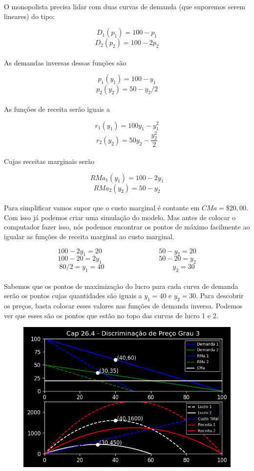 \documentclass[a4paper,11pt,oneside]{book}
\theoremstyle{definition}
\theoremstyle{break}
\begin{document}
O monopolista precisa lidar com duas curvas de demanda (que suporemos serem lineares) do tipo:

$$ D_1(p_1) = 100 - p_1 $$
$$ D_2(p_2) = 100 - 2p_2 $$
\\
As demandas inversas dessas funções são

$$ p_1(y_1) = 100 - y_1 $$
$$ p_2(y_2) = 50 - y_2/2 $$
\\
As funções de receita serão iguais a

$$ r_1(y_1) = 100y_1 - y_{1}^{2} $$
$$ r_2(y_2) = 50y_2 - \frac{y_{2}^{2}}{2} $$
\\
Cujas receitas marginais serão

$$ RMa_1(y_1) = 100 - 2y_{1} $$
$$ RMa_2(y_2) = 50 - y_{2} $$
\\
Para simplificar vamos supor que o custo marginal é contante em $CMa = \$ 20,00 $. Com isso já podemos criar uma simulação do modelo. Mas antes de colocar o computador fazer isso, nós podemos encontrar os pontos de máximo facilmente ao igualar as funções de receita marginal ao custo marginal.

$$ 100 - 2y_{1} = 20 \hspace{100pt} 50 - y_{2} = 20 $$
$$ 100 - 20 = 2y_{1} \hspace{100pt} 50 - 20 = y_{2} $$
$$ 80/2 = y_{1} = 40 \hspace{120pt} y_2 = 30 $$
\\
Sabemos que os pontos de maximização do lucro para cada curva de demanda serão os pontos cujas quantidades são iguais a $y_1 = 40$ e $y_2 = 30$. Para descobrir os preços, basta colocar esses valores nas funções de demanda inversa. Podemos ver que esses são os pontos que estão no topo das curvas de lucro 1 e 2.

\begin{figure}[H]
\centering
\includegraphics[scale=0.8]{cap26_4-discriminacao_grau3.png}
\end{figure}
\end{document}
